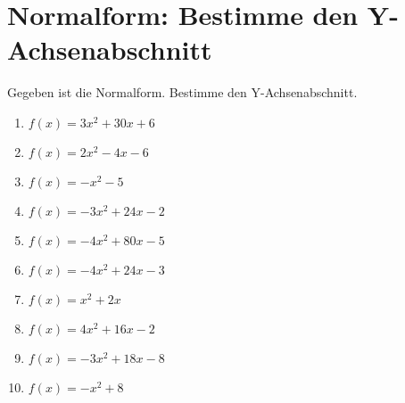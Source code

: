 \documentclass{article}%
\begin{document}
\section{Normalform: Bestimme den Y{-}Achsenabschnitt}%
\label{sec:NormalformBestimmedenY{-}Achsenabschnitt}%
Gegeben ist die Normalform. Bestimme den Y{-}Achsenabschnitt.%
\begin{enumerate}[label=\alph*)]%
\item%
\newline\vspace{0.5cm} $f(x)=3x^2 + 30x + 6$%
\item%
\newline\vspace{0.5cm} $f(x)=2x^2 - 4x - 6$%
\item%
\newline\vspace{0.5cm} $f(x)=-x^2 - 5$%
\item%
\newline\vspace{0.5cm} $f(x)=-3x^2 + 24x - 2$%
\item%
\newline\vspace{0.5cm} $f(x)=-4x^2 + 80x - 5$%
\item%
\newline\vspace{0.5cm} $f(x)=-4x^2 + 24x - 3$%
\item%
\newline\vspace{0.5cm} $f(x)=x^2 + 2x$%
\item%
\newline\vspace{0.5cm} $f(x)=4x^2 + 16x - 2$%
\item%
\newline\vspace{0.5cm} $f(x)=-3x^2 + 18x - 8$%
\item%
\newline\vspace{0.5cm} $f(x)=-x^2 + 8$%
\end{enumerate}

%
\end{document}
